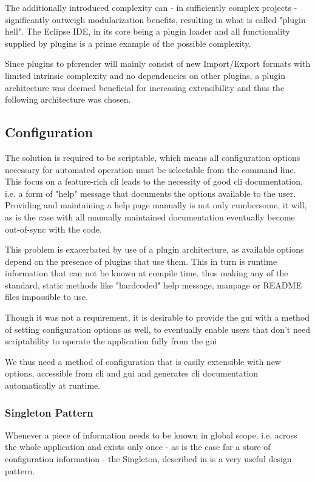 The additionally introduced complexity can - in sufficiently complex projects - significantly outweigh modularization benefits, resulting in what is called "plugin hell".
The Eclipse IDE, in its core being a plugin loader and all functionality supplied by plugins is a prime example of the possible complexity.

Since plugins to pfcrender will mainly consist of new Import/Export formats with limited intrinsic complexity and no dependencies on other plugins, a plugin architecture was deemed beneficial for increasing extensibility and thus the following architecture was chosen.


\subsection{Configuration}
The solution is required to be scriptable, which means all configuration options necessary for automated operation must be selectable from the command line.
This focus on a feature-rich \gls{cli} leads to the necessity of good \gls{cli} documentation, i.e. a form of "help" message that documents the options available to the user.
Providing and maintaining a help page manually is not only cumbersome, it will, as is the case with all manually maintained documentation eventually become out-of-sync with the code.

This problem is exacerbated by use of a plugin architecture, as available options depend on the presence of plugins that use them. This in turn is runtime information that can not be known at compile time, thus making any of the standard, static methods like "hardcoded" help message, manpage or README files impossible to use.

Though it was not a requirement, it is desirable to provide the \gls{gui} with a method of setting configuration options as well, to eventually enable users that don't need scriptability to operate the application fully from the \gls{gui}

We thus need a method of configuration that is easily extensible with new options, accessible from \gls{cli} and \gls{gui} and generates \gls{cli} documentation automatically at runtime.

\subsubsection{Singleton Pattern}
\label{sec:ston}
Whenever a piece of information needs to be known in global scope, i.e. across the whole application and exists only once - as is the case for a store of configuration information - the Singleton, described in \citet{Gamma1994} is a very useful design pattern. 

